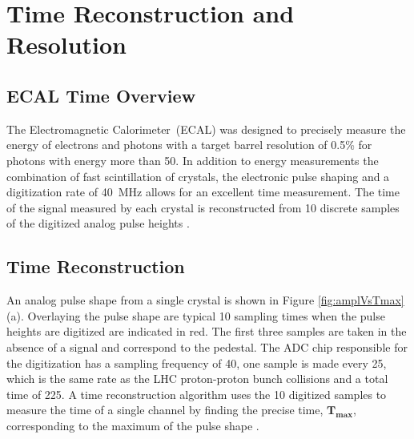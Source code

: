 \chapter{Time Reconstruction and Resolution}
\section*{ECAL Time Overview}
The Electromagnetic Calorimeter~(ECAL) was designed to precisely measure the energy of electrons and photons with a target barrel resolution of 0.5\% for photons with energy more than 50\GeV. In addition to energy measurements the combination of fast scintillation of \pb crystals, the electronic pulse shaping and a digitization rate of 40~MHz allows for an excellent time measurement.  
The time of the signal measured by each crystal is reconstructed from 10 discrete samples of the digitized analog pulse heights \cite{ECALTDR,ECALREADOUT,ECAL}. 
\section{Time Reconstruction}\label{timereco}
An analog pulse shape from a single crystal is shown in Figure \ref{fig:amplVsTmax}(a). 
Overlaying the pulse shape are typical 10 sampling times when the pulse heights are digitized are indicated in red. The first three samples are taken in the absence of a signal and correspond to the pedestal. The ADC chip responsible for the digitization has a sampling frequency of 40\MHz, \ie one sample is made every 25\ns, which is the same rate as the LHC proton-proton bunch collisions and a total time of 225\ns. A time reconstruction algorithm uses the 10 digitized samples to measure the time of a single channel by finding the precise time, $\mathbf{T_{max}}$, corresponding to the maximum of the pulse shape \cite{RECOAMPLI,TIME}. 

